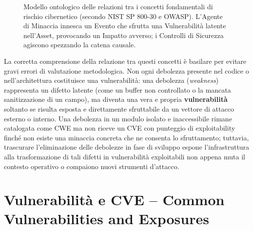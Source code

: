 \documentclass[../../main.tex]{subfiles}
\begin{document}
\begin{figure}[htbp]
{%
}
\caption{Modello ontologico delle relazioni tra i concetti fondamentali di rischio cibernetico (secondo NIST SP 800-30 e OWASP). L'Agente di Minaccia innesca un Evento che sfrutta una Vulnerabilità latente nell'Asset, provocando un Impatto avverso; i Controlli di Sicurezza agiscono spezzando la catena causale.}
\label{fig:modello_ontologico_rischio}
\end{figure}

La corretta comprensione della relazione tra questi concetti è basilare per evitare gravi errori di valutazione metodologica. Non ogni debolezza presente nel codice o nell'architettura costituisce una vulnerabilità: una debolezza (\textit{weakness}) rappresenta un difetto latente (come un buffer non controllato o la mancata sanitizzazione di un campo), ma diventa una vera e propria \textbf{vulnerabilità} soltanto se risulta esposta e direttamente sfruttabile da un vettore di attacco esterno o interno. Una debolezza in un modulo isolato e inaccessibile rimane catalogata come CWE ma non riceve un CVE con punteggio di exploitability finché non esiste una minaccia concreta che ne consenta lo sfruttamento; tuttavia, trascurare l'eliminazione delle debolezze in fase di sviluppo espone l'infrastruttura alla trasformazione di tali difetti in vulnerabilità exploitabili non appena muta il contesto operativo o compaiono nuovi strumenti d'attacco.

\section{Vulnerabilità e CVE -- Common Vulnerabilities and Exposures}
\label{sec:cve_cvss}
\end{document}
